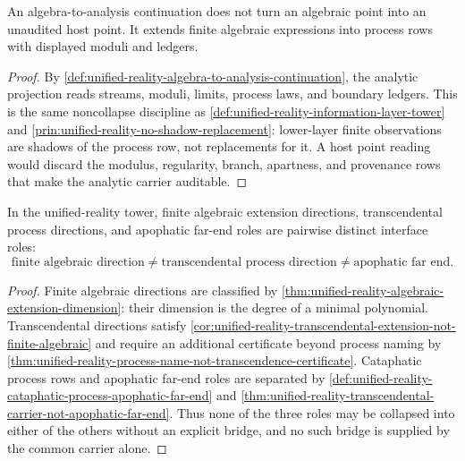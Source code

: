 \begin{theorem}
\label{thm:unified-reality-algebra-to-analysis-process-extension}
An algebra-to-analysis continuation does not turn an algebraic point
into an unaudited host point. It extends finite algebraic expressions
into process rows with displayed moduli and ledgers.
\end{theorem}

\begin{proof}
By
\autoref{def:unified-reality-algebra-to-analysis-continuation}, the
analytic projection reads streams, moduli, limits, process laws, and
boundary ledgers. This is the same noncollapse discipline as
\autoref{def:unified-reality-information-layer-tower} and
\autoref{prin:unified-reality-no-shadow-replacement}: lower-layer
finite observations are shadows of the process row, not replacements
for it. A host point reading would discard the modulus, regularity,
branch, apartness, and provenance rows that make the analytic carrier
auditable.
\end{proof}

\begin{theorem}
\label{thm:unified-reality-transcendental-process-far-end-separation}
In the unified-reality tower, finite algebraic extension directions,
transcendental process directions, and apophatic far-end roles are
pairwise distinct interface roles:
$$
\text{finite algebraic direction}
\neq
\text{transcendental process direction}
\neq
\text{apophatic far end}.
$$
\end{theorem}

\begin{proof}
Finite algebraic directions are classified by
\autoref{thm:unified-reality-algebraic-extension-dimension}: their
dimension is the degree of a minimal polynomial. Transcendental
directions satisfy
\autoref{cor:unified-reality-transcendental-extension-not-finite-algebraic}
and require an additional certificate beyond process naming by
\autoref{thm:unified-reality-process-name-not-transcendence-certificate}.
Cataphatic process rows and apophatic far-end roles are separated by
\autoref{def:unified-reality-cataphatic-process-apophatic-far-end} and
\autoref{thm:unified-reality-transcendental-carrier-not-apophatic-far-end}.
Thus none of the three roles may be collapsed into either of the others
without an explicit bridge, and no such bridge is supplied by the common
carrier alone.
\end{proof}
